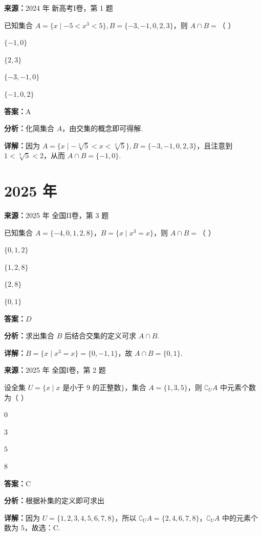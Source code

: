 \begin{question}[points=5]
\textbf{来源：}2024 年 新高考I卷，第 1 题\par
已知集合 $A=\{x\mid -5 < x^3 < 5\}, B=\{-3,-1,0,2,3\}$，则 $A\cap B=$（ ）
\begin{choices}
  \item $\{-1,0\}$
  \item $\{2,3\}$
  \item $\{-3,-1,0\}$
  \item $\{-1,0,2\}$
\end{choices}
\begin{solution}
\textbf{答案：}A

\textbf{分析：}化简集合 $A$，由交集的概念即可得解.

\textbf{详解：}因为 $A=\{x\mid -\sqrt[3]{5} < x < \sqrt[3]{5}\}, B=\{-3,-1,0,2,3\}$，且注意到 $1 < \sqrt[3]{5} < 2$，从而 $A\cap B=\{-1,0\}$.
\end{solution}
\end{question}

\section*{2025 年}

\begin{question}[points=5]
\textbf{来源：}2025 年 全国II卷，第 3 题\par
已知集合 $A=\{-4,0,1,2,8\}$，$B=\{x\mid x^3=x\}$，则 $A\cap B=$（ ）
\begin{choices}
  \item $\{0,1,2\}$
  \item $\{1,2,8\}$
  \item $\{2,8\}$
  \item $\{0,1\}$
\end{choices}
\begin{solution}
\textbf{答案：}$D$

\textbf{分析：}求出集合 $B$ 后结合交集的定义可求 $A\cap B$.

\textbf{详解：}$B=\{x\mid x^3=x\}=\{0,-1,1\}$，故 $A\cap B=\{0,1\}$.
\end{solution}
\end{question}

\begin{question}[points=5]
\textbf{来源：}2025 年 全国I卷，第 2 题\par
设全集 $U = \{ x \mid x \text{ 是小于 } 9 \text{ 的正整数} \}$，集合 $A = \{1,3,5\}$，则 $\complement_U A$ 中元素个数为（ ）
\begin{choices}
  \item $0$
  \item $3$
  \item $5$
  \item $8$
\end{choices}
\begin{solution}
\textbf{答案：}C

\textbf{分析：}根据补集的定义即可求出

\textbf{详解：}因为 $U = \{1,2,3,4,5,6,7,8\}$，所以 $\complement_U A = \{2,4,6,7,8\}$，$\complement_U A$ 中的元素个数为 $5$，故选：C.
\end{solution}
\end{question}

